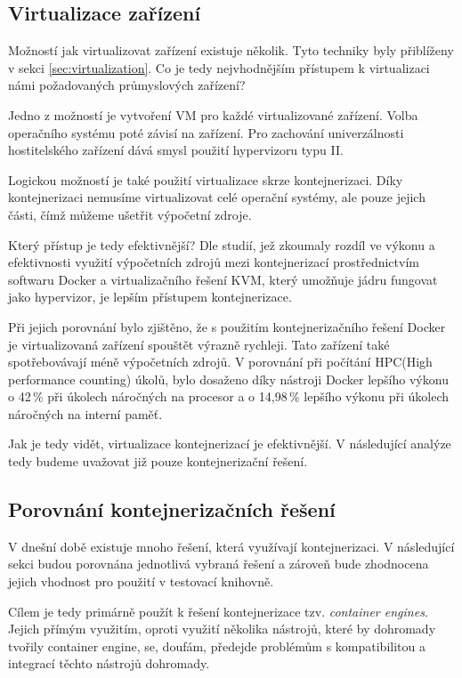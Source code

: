 \subsection{Virtualizace zařízení}

Možností jak virtualizovat zařízení existuje několik. Tyto techniky byly přiblíženy v sekci \ref{sec:virtualization}. Co je tedy nejvhodnějším přístupem k virtualizaci námi požadovaných průmyslových zařízení? 

Jedno z možností je vytvoření VM pro každé virtualizované zařízení. Volba operačního systému poté závisí na zařízení. Pro zachování univerzálnosti hostitelského zařízení dává smysl použití hypervizoru typu II.

Logickou možností je také použití virtualizace skrze kontejnerizaci. Díky kontejnerizaci nemusíme virtualizovat celé operační systémy, ale pouze jejich části, čímž můžeme ušetřit výpočetní zdroje.

Který přístup je tedy efektivnější? Dle studií, jež zkoumaly rozdíl ve výkonu a efektivnosti využití výpočetních zdrojů mezi kontejnerizací prostřednictvím softwaru Docker a virtualizačního řešení KVM, který umožňuje jádru fungovat jako hypervizor, je lepším přístupem kontejnerizace. 

Při jejich porovnání bylo zjištěno, že s použitím kontejnerizačního řešení Docker je virtualizovaná zařízení spouštět výrazně rychleji. Tato zařízení také spotřebovávají méně výpočetních zdrojů. V porovnání při počítání HPC(High performance counting) úkolů, bylo dosaženo díky nástroji Docker lepšího výkonu o 42\,\% při úkolech náročných na procesor a o 14,98\,\% lepšího výkonu při úkolech náročných na interní paměť.\cite{kvmdockercomp}\cite{2021virt} 

Jak je tedy vidět, virtualizace kontejnerizací je efektivnější. V následující analýze tedy budeme uvažovat již pouze kontejnerizační řešení. 

\subsection{Porovnání kontejnerizačních řešení}

V dnešní době existuje mnoho řešení, která využívají kontejnerizaci. V následující sekci budou porovnána jednotlivá vybraná řešení a zároveň bude zhodnocena jejich vhodnost pro použití v testovací knihovně. 

Cílem je tedy primárně použít k řešení kontejnerizace tzv. \textit{container engines}. Jejich přímým využitím, oproti využití několika nástrojů, které by dohromady tvořily container engine, se, doufám, předejde problémům s kompatibilitou a integrací těchto nástrojů dohromady.

